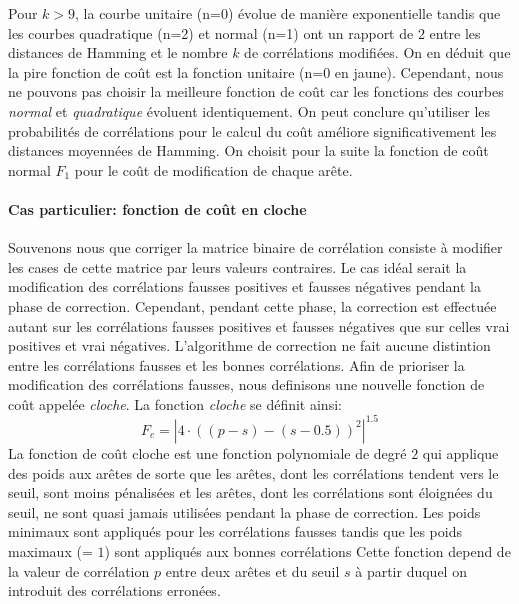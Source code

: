 Pour $k>9$, la courbe unitaire (n=0) \'evolue de mani\`ere exponentielle tandis que les courbes quadratique (n=2) et normal (n=1) ont un rapport de $2$ entre les distances de Hamming et le nombre $k$ de corr\'elations modifi\'ees.
On en d\'eduit que la pire fonction de co\^ut est la fonction unitaire (n=0 en jaune).
\newline
Cependant, nous ne pouvons pas choisir la meilleure fonction de co\^ut car les fonctions des courbes {\em normal} et {\em quadratique} \'evoluent identiquement.
 On peut conclure qu'utiliser les probabilit\'es de corr\'elations pour le calcul du co\^ut am\'eliore significativement les distances moyenn\'ees de Hamming.
 \newline
 On choisit pour la suite la fonction de co\^ut normal $F_1$ pour le co\^ut de modification de chaque ar\^ete. 

\paragraph{Cas particulier: fonction de co\^ut en cloche}

Souvenons nous que corriger la matrice binaire de corr\'elation consiste \`a modifier les cases de cette matrice par leurs valeurs contraires.
Le cas id\'eal serait la modification des corr\'elations fausses positives et fausses n\'egatives pendant la phase de correction.
Cependant, pendant cette phase, la correction est effectu\'ee autant sur les corr\'elations fausses positives et fausses n\'egatives que sur celles vrai positives et vrai n\'egatives.
L'algorithme de correction ne fait aucune distintion entre les corr\'elations fausses et les bonnes corr\'elations.
Afin de prioriser la modification des corr\'elations fausses, nous definisons une nouvelle fonction de co\^ut appel\'ee {\em cloche}.
\newline
La fonction {\em cloche} se d\'efinit ainsi:
\begin{equation}
	F_c = | 4\cdot((p-s) - (s-0.5))^2 |^{1.5}  
\end{equation}
La fonction de co\^ut cloche est une fonction polynomiale de degr\'e $2$ qui applique des poids aux ar\^etes de sorte que les ar\^etes, dont les corr\'elations tendent vers le seuil, sont moins p\'enalis\'ees et les ar\^etes, dont les corr\'elations sont \'eloign\'ees du seuil, ne sont quasi jamais utilis\'ees pendant la phase de correction. 
Les poids minimaux sont appliqu\'es pour les corr\'elations fausses tandis que les poids maximaux (= $1$) sont appliqu\'es aux bonnes corr\'elations
Cette fonction depend de la valeur de corr\'elation $p$ entre deux ar\^etes et du seuil $s$ \`a partir duquel on introduit des corr\'elations erron\'ees.
\newline

